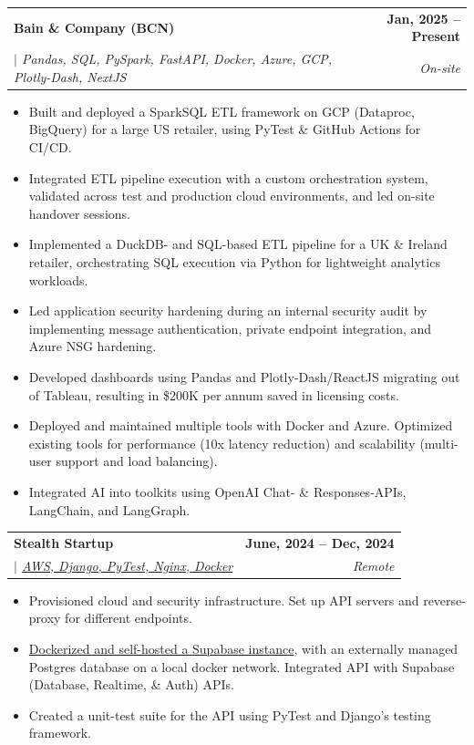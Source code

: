 \documentclass[letterpaper,11pt]{article}
\makeatletter
\newcommand{\uniformunderline}[1]{%
  \uline{\phantom{#1}}%
  \llap{\contour{white}{#1}}%
}
\newcommand{\resumeItem}[1]{
  \item\small{
    {#1 \vspace{-1.5pt}}
  }
}
\newcommand{\resumeSubheading}[4]{
  \vspace{-2pt}\item
    \begin{tabular*}{1.0\textwidth}[t]{l@{\extracolsep{\fill}}r}
      \textbf{\large#1} & \textbf{\small #2} \\
      \textit{\large#3} & \textit{\small #4} \\
      
    \end{tabular*}\vspace{-7pt}
}
\newcommand{\resumeItemListStart}{\begin{itemize}}
\newcommand{\resumeItemListEnd}{\end{itemize}\vspace{-5pt}}
\makeatother
\begin{document}
        \resumeSubheading
            {Bain \& Company (BCN)}{Jan, 2025 -- Present} 
            {\uniformunderline{Analyst} $|$ \textnormal{Pandas, SQL, PySpark, FastAPI, Docker, Azure, GCP, Plotly-Dash, NextJS } } {On-site}
            \resumeItemListStart
                \resumeItem{\normalsize{Built and deployed a SparkSQL ETL framework on GCP (Dataproc, BigQuery) for a large US retailer, \newline using PyTest \& GitHub Actions for CI/CD.}}
                \resumeItem{\normalsize{Integrated ETL pipeline execution with a custom orchestration system, validated across test and production cloud environments, and led on-site handover sessions.}}
                \resumeItem{\normalsize{Implemented a DuckDB- and SQL-based ETL pipeline for a UK \& Ireland retailer, orchestrating SQL execution via Python for lightweight analytics workloads.}}
                \resumeItem{\normalsize{Led application security hardening during an internal security audit by implementing message authentication, private endpoint integration, and Azure NSG hardening.}}
                \resumeItem{\normalsize{Developed dashboards using Pandas and Plotly-Dash/ReactJS migrating out of Tableau, resulting in \newline \$200K per annum saved in licensing costs.}}
                \resumeItem{\normalsize{Deployed and maintained multiple tools with Docker and Azure. Optimized existing tools for performance (10x latency reduction) and scalability (multi-user support and load balancing).}}
                \resumeItem{\normalsize{Integrated AI into toolkits using OpenAI Chat- \& Responses-APIs, LangChain, and LangGraph.}}
            \resumeItemListEnd

        \resumeSubheading
            {Stealth Startup}{June, 2024 -- Dec, 2024} 
            {\uniformunderline{DevOps \& Application Engineer} $|$ \textnormal{\href{https://github.com/saharshbhansali/supabase-decoupled-postgres}{AWS, Django, PyTest, Nginx, Docker \footnotesize{\raisebox{-0.05\height}\faExternalLink}}} }{Remote}
            \resumeItemListStart
                \resumeItem{\normalsize{Provisioned cloud and security infrastructure. Set up API servers and reverse-proxy for different endpoints.}}
                \resumeItem{\normalsize{\href{https://github.com/saharshbhansali/supabase-decoupled-postgres}{Dockerized and self-hosted a Supabase instance}, with an externally managed Postgres database on a local docker network. Integrated API with Supabase (Database, Realtime, \& Auth) APIs.}} 
                \resumeItem{\normalsize{Created a unit-test suite for the API using PyTest and Django's testing framework.}}
            \resumeItemListEnd  
\end{document}
